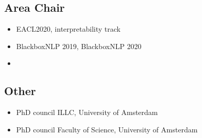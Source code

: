 \subsection{Area Chair}
\begin{itemize}
    \item EACL2020, interpretability track
    \item BlackboxNLP 2019, BlackboxNLP 2020
    \item[]
\end{itemize}

\subsection{Other}
\begin{itemize}
    \item PhD council ILLC, University of Amsterdam
    \item PhD council Faculty of Science, University of Amsterdam
\end{itemize}
